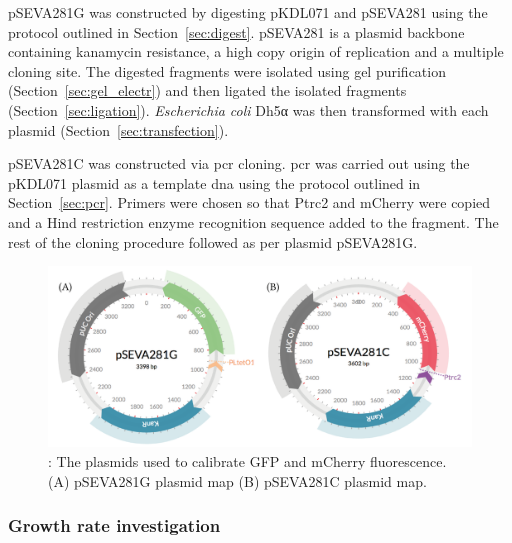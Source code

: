 pSEVA281G was constructed by digesting pKDL071 and pSEVA281 using the protocol outlined in Section~\ref{sec:digest}. pSEVA281 is a plasmid backbone containing kanamycin resistance, a high copy origin of replication and a multiple cloning site. The digested fragments were isolated using gel purification (Section~\ref{sec:gel_electr}) and then ligated the isolated fragments (Section~\ref{sec:ligation}). \textit{Escherichia coli} Dh5α was then transformed with each plasmid (Section~\ref{sec:transfection}). 

pSEVA281C was constructed via \acrshort{pcr} cloning. \acrshort{pcr} was carried out using the pKDL071 plasmid as a template \acrshort{dna} using the protocol outlined in Section~\ref{sec:pcr}. Primers were chosen so that Ptrc2 and mCherry were copied and a Hind restriction enzyme recognition sequence added to the fragment. The rest of the cloning procedure followed as per plasmid pSEVA281G.

\begin{figure}[tb]
	\begin{center}
		\includegraphics[width=\textwidth]{../../chapters/chapterABCFlow/images/plasmids_constructed.png}
		\caption[pSEVA281G and pSEVA281C plasmid map]{\label{fig:psevas}: The plasmids used to calibrate GFP and mCherry fluorescence. (A) pSEVA281G plasmid map (B) pSEVA281C plasmid map.  }
	\end{center}
\end{figure}


\subsubsection{Growth rate investigation}

